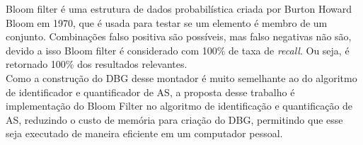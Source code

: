 \documentclass[a4paper, 12pt]{article}
\begin{document}
\indent Bloom filter é uma estrutura de dados probabilística criada por Burton Howard Bloom em 1970, que é usada para testar se um elemento é membro de um conjunto. Combinações falso positiva são possíveis, mas falso negativas não são, devido a isso Bloom filter é considerado com 100\% de taxa de \emph{recall}. Ou seja, é retornado 100\% dos resultados relevantes.\\
\indent Como a construção do DBG desse montador é muito semelhante ao do algoritmo de identificador e quantificador de AS, a proposta desse trabalho é implementação do Bloom Filter no algoritmo de identificação e quantificação de AS, reduzindo o custo de memória para criação do DBG, permitindo que esse seja executado de maneira eficiente em um computador pessoal.
\end{document}
